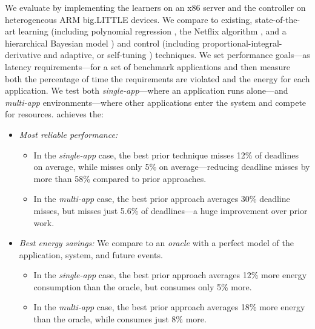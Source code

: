 We evaluate \SYSTEM{} by implementing the learners on an x86 server
and the controller on heterogeneous ARM big.LITTLE devices.  We
compare \SYSTEM{} to existing, state-of-the-art learning (including
polynomial regression \cite{Koala,dubach2010}, the Netflix algorithm
\cite{netflix,Paragon}, and a hierarchical Bayesian model \cite{LEO})
and control (including proportional-integral-derivative
\cite{Hellerstein2004a} and adaptive, or self-tuning
\cite{HandbookControl}) techniques.  We set performance goals---as
latency requirements---for a set of benchmark applications and then
measure both the percentage of time the requirements are violated and
the energy for each application.  We test both
\emph{single-app}---where an application runs alone---and
\emph{multi-app} environments---where other applications enter the
system and compete for resources.  \SYSTEM{} achieves the:
\begin{itemize}[leftmargin=1em]
\item \textit{Most reliable performance:}
  \begin{itemize}[leftmargin=1em]
  \item In the \emph{single-app} case, the best prior technique misses
    12\% of deadlines on average, while \SYSTEM{} misses only 5\% on
    average---reducing deadline misses by more than 58\% compared to
    prior approaches.
  \item In the \emph{multi-app} case, the best prior approach averages
    30\% deadline misses, but \SYSTEM{} misses just 5.6\% of
    deadlines---a huge improvement over prior work.
  \end{itemize}
\item \textit{Best energy savings:} We compare to an \emph{oracle}
  with a perfect model of the application, system, and future events.
  \begin{itemize}[leftmargin=1em]
  \item In the \emph{single-app} case, the best prior approach
    averages 12\% more energy consumption than the oracle, but
    \SYSTEM{} consumes only 5\% more.
  \item In the \emph{multi-app} case, the best prior approach averages
    18\% more energy than the oracle, while \SYSTEM{} consumes just
    8\% more.
  \end{itemize}
\end{itemize}

